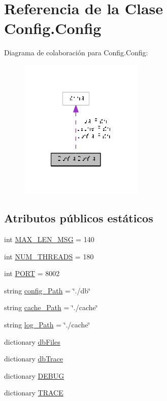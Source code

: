 \hypertarget{class_config_1_1_config}{\section{Referencia de la Clase Config.\-Config}
\label{class_config_1_1_config}
}


Diagrama de colaboración para Config.\-Config\-:\nopagebreak
\begin{figure}[H]
\begin{center}
\leavevmode
\includegraphics[width=167pt]{class_config_1_1_config__coll__graph}
\end{center}
\end{figure}
\subsection*{Atributos públicos estáticos}
\begin{DoxyCompactItemize}
\item 
int \hyperlink{class_config_1_1_config_a81b4f232892a63987c0712d291d68cd3}{M\-A\-X\-\_\-\-L\-E\-N\-\_\-\-M\-S\-G} = 140
\item 
int \hyperlink{class_config_1_1_config_a30a0b4f26a731f1f315b86b16eef807c}{N\-U\-M\-\_\-\-T\-H\-R\-E\-A\-D\-S} = 180
\item 
int \hyperlink{class_config_1_1_config_aef20c383d5c356bfc5771e132ad241df}{P\-O\-R\-T} = 8002
\item 
string \hyperlink{class_config_1_1_config_a2cf86b6dc19ce8b8458261d408a66d3a}{config\-\_\-\-Path} = \char`\"{}./db\char`\"{}
\item 
string \hyperlink{class_config_1_1_config_ac40dcb73f850406655e85747ee4f244a}{cache\-\_\-\-Path} = \char`\"{}./cache\char`\"{}
\item 
string \hyperlink{class_config_1_1_config_a101073e22bb0e11ae1e78063267eaf35}{log\-\_\-\-Path} = \char`\"{}./cache\char`\"{}
\item 
dictionary \hyperlink{class_config_1_1_config_a62ca676b07391529a5c1abd433bed57f}{db\-Files}
\item 
dictionary \hyperlink{class_config_1_1_config_af7a49b43885faa51f5f5b5687a05120c}{db\-Trace}
\item 
dictionary \hyperlink{class_config_1_1_config_a1d5bf72f9f7f8047bc648261155e3141}{D\-E\-B\-U\-G}
\item 
dictionary \hyperlink{class_config_1_1_config_aedf405e5fbfe131f86b5bde5de495fbc}{T\-R\-A\-C\-E}
\end{DoxyCompactItemize}


